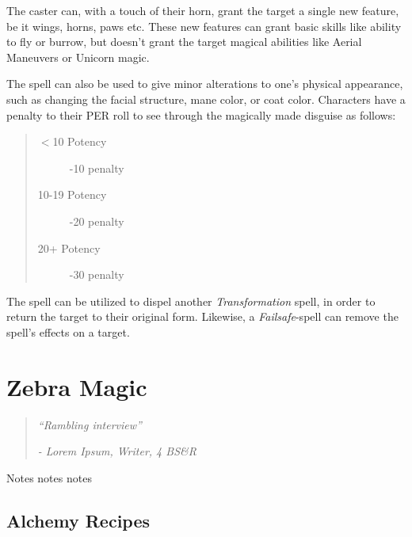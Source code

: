 \documentclass[11pt,a4paper,twocolumn]{book}
\begin{document}
The caster can, with a touch of their horn, grant the target a single new feature, be it wings, horns, paws etc. These new features can grant basic skills like ability to fly or burrow, but doesn't grant the target magical abilities like Aerial Maneuvers or Unicorn magic.

The spell can also be used to give minor alterations to one's physical appearance, such as changing the facial structure, mane color, or coat color. Characters have a penalty to their PER roll to see through the magically made disguise as follows:

\begin{quote}
	\begin{description}
		\item[$<$10 Potency] 	-10 penalty
		\item[10-19 Potency] 	-20 penalty
		\item[20+ Potency] 		-30 penalty
	\end{description}
\end{quote}

The spell can be utilized to dispel another \textit{Transformation} spell, in order to return the target to their original form. Likewise, a \textit{Failsafe}-spell can remove the spell's effects on a target.

\vfill


\chapter{Zebra Magic}

\begin{quote}
	\emph{``Rambling interview''}
	
	\emph{- Lorem Ipsum, Writer, 4 BS\&R}
\end{quote}

Notes notes notes

\section*{Alchemy Recipes}

\end{document}
